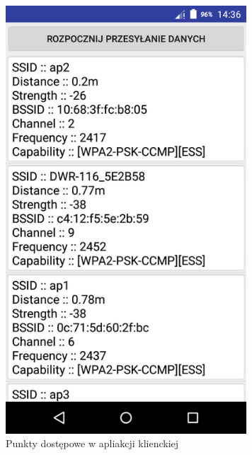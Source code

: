 \documentclass{article}
\begin{document}
\begin{figure}[H]
	\centering
	\includegraphics[width=9cm]{klient.png}
	\caption{Punkty dostępowe w apliakcji klienckiej}
	\label{fig:rysowanie.jpg}
\end{figure}
\end{document}
